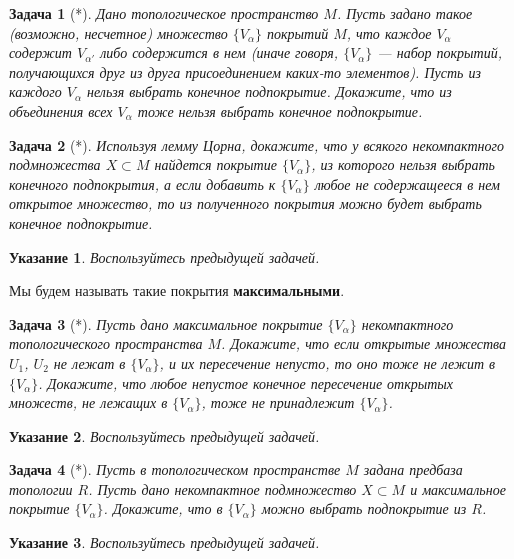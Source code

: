 \documentclass[12pt]{book}
\theoremstyle{upshape}
\newtheorem{zadacha}{Задача}[chapter]
\theoremstyle{generic}
\theoremstyle{upshapenonumber}
\newtheorem{ukazanie}{Указание}[section]
\newcommand{\следствие}{%
     \refstepcounter{teorema}
     {\noindent\bf Следствие \thechapter.\arabic{teorema}:\ }}
\newcommand{\пример}{%
     \refstepcounter{teorema}
     {\noindent\bf Пример \thechapter.\arabic{teorema}:\ }}
\newcommand{\лемма}{%
     \refstepcounter{teorema}
     {\noindent\bf Лемма \thechapter.\arabic{teorema}:\ }}
\newcommand{\теорема}{%
     \refstepcounter{teorema}
     {\noindent\bf Теорема \thechapter.\arabic{teorema}:\ }}
\newcommand{\утверждение}{%
     \refstepcounter{teorema}
     {\noindent\bf Утверждение \thechapter.\arabic{teorema}:\ }}
\begin{document}
{\begin{zadacha}[*]
Дано топологическое пространство $M$.
Пусть задано такое (возможно, несчетное) множество $\{ V_{\alpha}\}$
покрытий $M$,
что каждое $V_{\alpha}$ 
содержит $V_{\alpha'}$ либо содержится в нем
(иначе говоря, $\{ V_{\alpha}\}$ --- набор
покрытий, получающихся друг из друга присоединением
каких-то элементов). Пусть из каждого $V_{\alpha}$ 
нельзя выбрать конечное подпокрытие.
Докажите, что из объединения всех
$V_{\alpha}$ тоже нельзя выбрать 
конечное подпокрытие.
\end{zadacha}

\begin{zadacha}[*] 
Используя лемму Цорна,
докажите, что у всякого некомпактного подмножества
$X\subset M$ найдется покрытие $\{ V_{\alpha}\}$, 
из которого нельзя выбрать конечного подпокрытия,
а если добавить к $\{ V_{\alpha}\}$ любое не содержащееся
в нем открытое множество, то из полученного покрытия
можно будет выбрать конечное подпокрытие.
\end{zadacha}

\begin{ukazanie}
Воспользуйтесь предыдущей задачей.
\end{ukazanie}

Мы будем называть такие покрытия {\bf максимальными}.

\begin{zadacha}[*]
Пусть дано максимальное покрытие 
$\{V_{\alpha}\}$ некомпактного топологического
  пространства $M$. Докажите, что если
  открытые множества $U_1$, $U_2$ не лежат в 
$\{V_{\alpha}\}$, и их пересечение непусто, то оно
  тоже не лежит в $\{ V_{\alpha}\}$. Докажите, что
  любое непустое конечное пересечение
  открытых множеств, не лежащих в 
$\{V_{\alpha}\}$, тоже не принадлежит $\{ V_{\alpha}\}$.
\end{zadacha}

\begin{ukazanie}
Воспользуйтесь предыдущей задачей.
\end{ukazanie}

\begin{zadacha}[*]
Пусть в топологическом пространстве $M$ задана
предбаза топологии $R$. Пусть дано некомпактное подмножество
$X\subset M$ и максимальное покрытие
$\{ V_{\alpha}\}$. Докажите, что в 
$\{ V_{\alpha}\}$ можно выбрать 
подпокрытие из $R$.
\end{zadacha}

\begin{ukazanie}
Воспользуйтесь предыдущей задачей.
\end{ukazanie}

}
\end{document}
